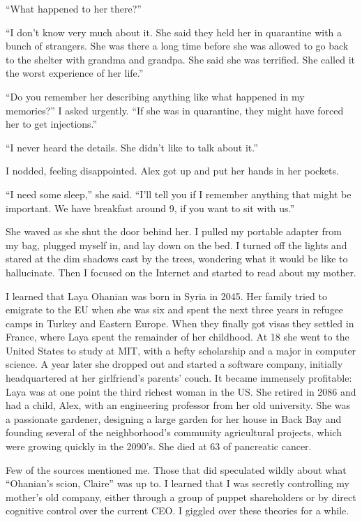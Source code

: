 \documentclass[10pt,b5paper]{article}
\begin{document}
``What happened to her there?''

``I don't know very much about it. She said they held her in quarantine
with a bunch of strangers. She was there a long time before she was
allowed to go back to the shelter with grandma and grandpa. She said
she was terrified. She called it the worst experience of her life.''

``Do you remember her describing anything like what happened in my
memories?'' I asked urgently.  ``If she was in quarantine, they might
have forced her to get injections.''

``I never heard the details. She didn't like to talk about it.''

I nodded, feeling disappointed. Alex got up and put her hands in
her pockets.

``I need some sleep,'' she said. ``I'll tell you if I remember anything
that might be important. We have breakfast around 9, if you want to
sit with us.''

She waved as she shut the door behind her. I pulled my portable adapter
from my bag, plugged myself in, and lay down on the bed. I turned off
the lights and stared at the dim shadows cast by the trees, wondering
what it would be like to hallucinate. Then I focused on the Internet
and started to read about my mother.

I learned that Laya Ohanian was born in Syria in 2045.  Her family
tried to emigrate to the EU when she was six and spent the next three
years in refugee camps in Turkey and Eastern Europe. When they finally
got visas they settled in France, where Laya spent the remainder of
her childhood. At 18 she went to the United States to study at MIT,
with a hefty scholarship and a major in computer science. A year later
she dropped out and started a software company, initially headquartered
at her girlfriend's parents' couch. It became immensely profitable:
Laya was at one point the third richest woman in the US. She retired
in 2086 and had a child, Alex, with an engineering professor from her
old university. She was a passionate gardener, designing a large garden
for her house in Back Bay and founding several of the neighborhood's
community agricultural projects, which were growing quickly in the
2090's. She died at 63 of pancreatic cancer.

Few of the sources mentioned me. Those that did speculated wildly
about what ``Ohanian's scion, Claire'' was up to. I learned that I
was secretly controlling my mother's old company, either through a
group of puppet shareholders or by direct cognitive control over the
current CEO. I giggled over these theories for a while.
\end{document}
